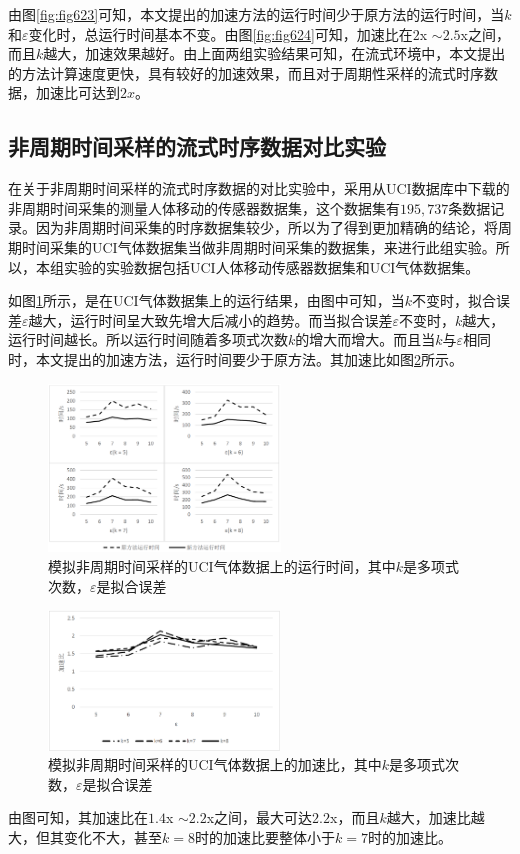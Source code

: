 由图\ref{fig:fig623}可知，本文提出的加速方法的运行时间少于原方法的运行时间，当$k$和$\varepsilon$变化时，总运行时间基本不变。由图\ref{fig:fig624}可知，加速比在$2$x $\sim 2.5$x之间，而且$k$越大，加速效果越好。由上面两组实验结果可知，在流式环境中，本文提出的方法计算速度更快，具有较好的加速效果，而且对于周期性采样的流式时序数据，加速比可达到$2x$。

\subsection{非周期时间采样的流式时序数据对比实验}
在关于非周期时间采样的流式时序数据的对比实验中，采用从UCI数据库中下载的非周期时间采集的测量人体移动的传感器数据集，这个数据集有$195,737$条数据记录。因为非周期时间采集的时序数据集较少，所以为了得到更加精确的结论，将周期时间采集的UCI气体数据集当做非周期时间采集的数据集，来进行此组实验。所以，本组实验的实验数据包括UCI人体移动传感器数据集和UCI气体数据集。

如图\ref{fig:fig627}所示，是在UCI气体数据集上的运行结果，由图中可知，当$k$不变时，拟合误差$\varepsilon$越大，运行时间呈大致先增大后减小的趋势。而当拟合误差$\varepsilon$不变时，$k$越大，运行时间越长。所以运行时间随着多项式次数$k$的增大而增大。而且当$k$与$\varepsilon$相同时，本文提出的加速方法，运行时间要少于原方法。其加速比如图\ref{fig:fig628}所示。

\begin{figure}[htb]
	\centering
	\includegraphics[width=0.55\textwidth]{figures/figure62x7Agas}
	\caption{模拟非周期时间采样的UCI气体数据上的运行时间，其中$k$是多项式次数，$\varepsilon$是拟合误差}\label{fig:fig627}
\end{figure}

\begin{figure}[htb]
	\centering
	\includegraphics[width=0.55\textwidth]{figures/figure62x8Agas}
	\caption{模拟非周期时间采样的UCI气体数据上的加速比，其中$k$是多项式次数，$\varepsilon$是拟合误差}\label{fig:fig628}
\end{figure}
由图可知，其加速比在$1.4$x $\sim 2.2$x之间，最大可达$2.2$x，而且$k$越大，加速比越大，但其变化不大，甚至$k=8$时的加速比要整体小于$k=7$时的加速比。

